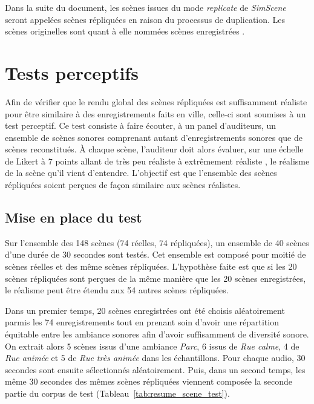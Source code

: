 Dans la suite du document, les scènes issues du mode \textit{replicate} de \textit{SimScene} seront appelées \og scènes répliquées \fg{} en raison du processus de duplication. Les scènes originelles sont quant à elle nommées \og scènes enregistrées \fg{}.


\section{Tests perceptifs}\label{sec:test}

Afin de vérifier que le rendu global des scènes répliquées est suffisamment réaliste pour être similaire à des enregistrements faits en ville, celle-ci sont soumises à un test perceptif. Ce test consiste à faire écouter, à un panel d'auditeurs, un ensemble de scènes sonores comprenant autant d'enregistrements sonores que de scènes reconstitués. À chaque scène, l'auditeur doit alors évaluer, sur une échelle de Likert à 7 points allant de \og très peu réaliste \fg{} à \og extrêmement réaliste \fg{}, le réalisme de la scène qu'il vient d'entendre. L'objectif est que l'ensemble des scènes répliquées soient perçues de façon similaire aux scènes réalistes.\\

\subsection{Mise en place du test}
\label{sec:test_BEI}

Sur l'ensemble des 148 scènes (74 réelles, 74 répliquées),  un ensemble de 40 scènes d'une durée de 30 secondes sont testés. Cet ensemble est composé pour moitié de scènes réelles et des même scènes répliquées. L'hypothèse faite est que si les 20 scènes répliquées sont perçues de la même manière que les 20 scènes enregistrées, le réalisme peut être étendu aux 54 autres scènes répliquées. 

Dans un premier temps, 20 scènes enregistrées ont été choisis aléatoirement parmis les 74 enregistrements tout en prenant soin d'avoir une répartition équitable entre les ambiance sonores afin d'avoir suffisamment de diversité sonore. On extrait alors 5 scènes issus d'une ambiance \textit{Parc}, 6 issus de \textit{Rue calme}, 4 de \textit{Rue animée} et 5 de \textit{Rue très animée}  dans les échantillons. Pour chaque audio, 30 secondes sont ensuite sélectionnés aléatoirement. Puis, dans un second temps, les même 30 secondes des mêmes scènes répliquées viennent composée la seconde partie du corpus de test  (Tableau~\ref{tab:resume_scene_test}).\\

